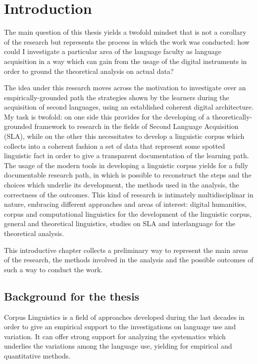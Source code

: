 \documentclass[a4paper,twoside,12pt,chapterprefix=false,bibliography=totocnumbered,listof=flat]{scrbook}
\theoremstyle{definition}
\theoremstyle{definition}
\theoremstyle{definition}
\theoremstyle{remark}
\begin{document}
\mainmatter

\chapter{Introduction}\label{introduction}

The main question of this thesis yields a twofold mindset that is not a
corollary of the research but represents the process in which the work
was conducted: how could I investigate a particular area of the language
faculty as language acquisition in a way which can gain from the usage
of the digital instruments in order to ground the theoretical analysis
on actual data?

The idea under this research moves across the motivation to investigate
over an empirically-grounded path the strategies shown by the learners
during the acquisition of second languages, using an established
coherent digital architecture. My task is twofold: on one side this
provides for the developing of a theoretically-grounded framework to
research in the fields of Second Language Acquisition (SLA), while on
the other this necessitates to develop a linguistic corpus which
collects into a coherent fashion a set of data that represent some
spotted linguistic fact in order to give a transparent documentation of
the learning path. The usage of the modern tools in developing a
linguistic corpus yields for a fully documentable research path, in
which is possible to reconstruct the steps and the choices which
underlie its development, the methods used in the analysis, the
correctness of the outcomes. This kind of research is intimately
multidisciplinar in nature, embracing different approaches and areas of
interest: digital humanities, corpus and computational linguistics for
the development of the linguistic corpus, general and theoretical
linguistics, studies on SLA and interlanguage for the theoretical
analysis.

This introductive chapter collects a preliminary way to represent the
main areas of the research, the methods involved in the analysis and the
possible outcomes of such a way to conduct the work.

\section{Background for the thesis}\label{background-for-the-thesis}

Corpus Linguistics is a field of approaches developed during the last
decades in order to give an empirical support to the investigations on
language use and variation. It can offer strong support for analyzing
the systematics which underlies the variations among the language use,
yielding for empirical and quantitative methods.
\end{document}
